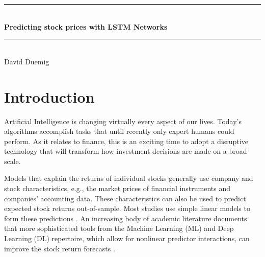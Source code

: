 \documentclass[10pt]{article}
\begin{document}
\begin{center}
  {\noindent\rule{\textwidth}{1.2pt}}\\[0.7em]
  {\LARGE\bfseries Predicting stock prices with LSTM Networks}\\[0.5em]
  {\noindent\rule{\textwidth}{1.2pt}}\\[1.0em]
  {\large David Duemig}\\[1.2em]
\end{center}

\begin{abstract}
In this project we explore a method of predicting stock price movements. We apply
a long short term memory (LSTM) based recurrent neural network (RNN) to predict
whether the S\&P 500 will increase (up) or decrease (down) over the next trading
month, using the features volatility, return and trading volume as three sets of
time sequence data. We use accuracy and the area under the ROC curve (AUC) to tune
hyper-parameters and to measure the performance of our prediction. It turns out
that the LSTM models perform much like the corresponding baseline linear
classification models, and that neither beats the naive rule of always predicting
``up''. Test AUCs lie between \minAUC{} and \maxAUC{}, and a timing strategy built
on the forecasts does not beat buying and holding after costs.
\end{abstract}

\section{Introduction}

Artificial Intelligence is changing virtually every aspect of our lives. Today's
algorithms accomplish tasks that until recently only expert humans could perform.
As it relates to finance, this is an exciting time to adopt a disruptive
technology that will transform how investment decisions are made on a broad scale.

Models that explain the returns of individual stocks generally use company and
stock characteristics, e.g., the market prices of financial instruments and
companies' accounting data. These characteristics can also be used to predict
expected stock returns out-of-sample. Most studies use simple linear models to
form these predictions \cite{blitz,lewellen}. An increasing body of academic
literature documents that more sophisticated tools from the Machine Learning (ML)
and Deep Learning (DL) repertoire, which allow for nonlinear predictor
interactions, can improve the stock return forecasts \cite{freyberger,gu,rapach}.
\end{document}
